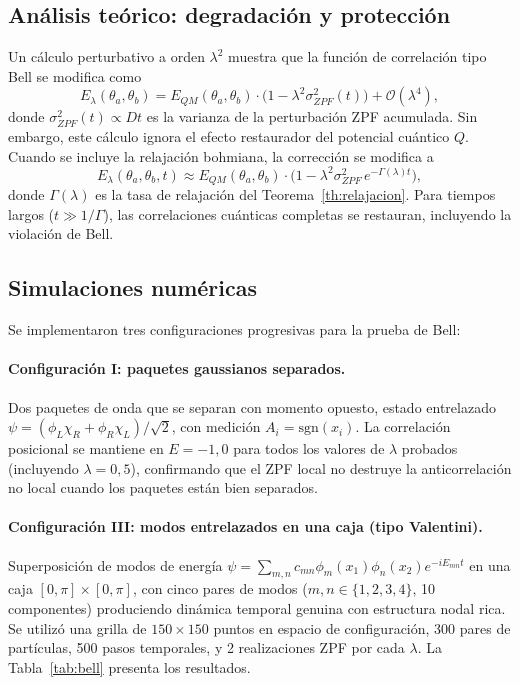 \documentclass[11pt,a4paper]{article}
\begin{document}
\subsection{Análisis teórico: degradación y protección}
\label{sec:bell_teoria}

Un cálculo perturbativo a orden $\lambda^2$ muestra que la función de
correlación tipo Bell se modifica como
\begin{equation}
E_\lambda(\theta_a,\theta_b) = E_{QM}(\theta_a,\theta_b)\cdot
\big(1-\lambda^2\sigma^2_{ZPF}(t)\big) + \mathcal{O}(\lambda^4),
\label{eq:correlacion_lambda}
\end{equation}
donde $\sigma^2_{ZPF}(t)\propto Dt$ es la varianza de la perturbación
ZPF acumulada. Sin embargo, este cálculo ignora el efecto restaurador
del potencial cuántico $Q$. Cuando se incluye la relajación bohmiana,
la corrección se modifica a
\begin{equation}
E_\lambda(\theta_a,\theta_b,t) \approx E_{QM}(\theta_a,\theta_b)\cdot
\big(1-\lambda^2\sigma^2_{ZPF}\,e^{-\Gamma(\lambda)t}\big),
\label{eq:correlacion_relajada}
\end{equation}
donde $\Gamma(\lambda)$ es la tasa de relajación del
Teorema~\ref{th:relajacion}. Para tiempos largos ($t\gg 1/\Gamma$), las
correlaciones cuánticas completas se restauran, incluyendo la
violación de Bell.

\subsection{Simulaciones numéricas}
\label{sec:bell_sim}

Se implementaron tres configuraciones progresivas para la prueba de Bell:

\paragraph{Configuración I: paquetes gaussianos separados.}
Dos paquetes de onda que se separan con momento opuesto, estado
entrelazado $\psi = (\phi_L\chi_R + \phi_R\chi_L)/\sqrt{2}$, con
medición $A_i=\mathrm{sgn}(x_i)$. La correlación posicional se mantiene
en $E=-1{,}0$ para todos los valores de $\lambda$ probados (incluyendo
$\lambda=0{,}5$), confirmando que el ZPF local no destruye la
anticorrelación no local cuando los paquetes están bien separados.

\paragraph{Configuración III: modos entrelazados en una caja
(tipo Valentini).}
Superposición de modos de energía
$\psi=\sum_{m,n}c_{mn}\phi_m(x_1)\phi_n(x_2)e^{-iE_{mn}t}$
en una caja $[0,\pi]\times[0,\pi]$, con cinco pares de modos
($m,n\in\{1,2,3,4\}$, 10 componentes) produciendo dinámica temporal
genuina con estructura nodal rica. Se utilizó una grilla de
$150\times 150$ puntos en espacio de configuración, 300 pares de
partículas, 500 pasos temporales, y 2 realizaciones ZPF por cada
$\lambda$. La Tabla~\ref{tab:bell} presenta los resultados.
\end{document}
